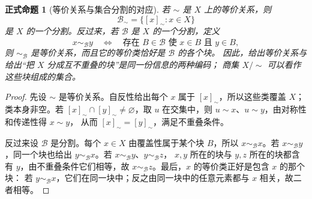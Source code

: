 \documentclass[UTF8,fontset=none,a4paper,11pt]{ctexart}
\theoremstyle{foundation-definition}
\theoremstyle{foundation-theorem}
\theoremstyle{foundation-proposition}
\newtheorem{proposition}[definition]{正式命题}
\theoremstyle{foundation-example}
\theoremstyle{foundation-remark}
\theoremstyle{foundation-theorem}
\begin{document}
\begin{proposition}[等价关系与集合分割的对应]\label{prop:equivalence-partition-correspondence}
若 \(\sim\) 是 \(X\) 上的等价关系，则
\[
\mathcal B_\sim=\{[x]_\sim:x\in X\}
\]
是 \(X\) 的一个分割。反过来，若 \(\mathcal B\) 是 \(X\) 的一个分割，定义
\[
x\sim_{\mathcal B}y
\quad\Longleftrightarrow\quad
\text{存在 }B\in\mathcal B\text{ 使 }x\in B\text{ 且 }y\in B,
\]
则 \(\sim_{\mathcal B}\) 是等价关系，而且它的等价类恰好是 \(\mathcal B\) 的各个块。
因此，给出等价关系与给出“把 \(X\) 分成互不重叠的块”是同一份信息的两种编码；
商集 \(X/{\sim}\) 可以看作这些块组成的集合。
\end{proposition}

\begin{proof}
先设 \(\sim\) 是等价关系。自反性给出每个 \(x\) 属于 \([x]_\sim\)，所以这些类覆盖
\(X\)；类本身非空。若 \([x]_\sim\cap[y]_\sim\ne\varnothing\)，取
\(u\) 在交集中，则 \(u\sim x\)、\(u\sim y\)，由对称性和传递性得 \(x\sim y\)，
从而 \([x]_\sim=[y]_\sim\)，满足不重叠条件。

反过来设 \(\mathcal B\) 是分割。每个 \(x\in X\) 由覆盖性属于某个块 \(B\)，所以
\(x\sim_{\mathcal B}x\)。若 \(x\sim_{\mathcal B}y\)，同一个块也给出
\(y\sim_{\mathcal B}x\)。若 \(x\sim_{\mathcal B}y\)、\(y\sim_{\mathcal B}z\)，
\(x,y\) 所在的块与 \(y,z\) 所在的块都含有 \(y\)，由不重叠条件它们相等，故
\(x\sim_{\mathcal B}z\)。最后，\(x\) 的等价类正好是包含 \(x\) 的那个块：
若 \(y\sim_{\mathcal B}x\)，它们在同一块中；反之由同一块中的任意元素都与 \(x\)
相关，故二者相等。
\end{proof}
\end{document}
